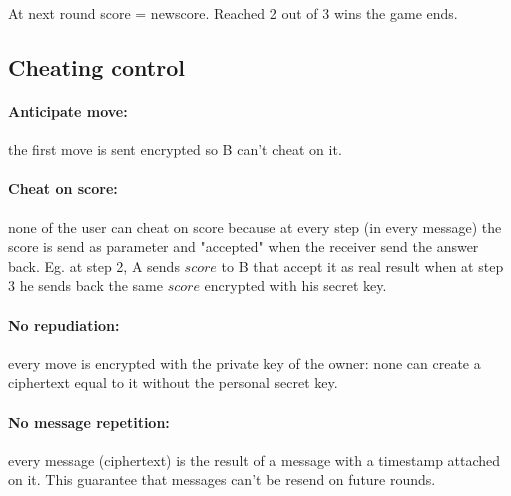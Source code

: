 \documentclass[11pt,a4paper]{article}
\begin{document}
At next round score = newscore. Reached 2 out of 3 wins the game ends.

\subsection{Cheating control}
\paragraph{\textbf{Anticipate move:}} the first move is sent encrypted so B can't cheat on it.
\paragraph{\textbf{Cheat on score:}} none of the user can cheat on score because at every step (in every message) the score is send as parameter and "accepted" when the receiver send the answer back.
Eg. at step 2, A sends $score$ to B that accept it as real result when at step 3 he sends back the same $score$ encrypted with his secret key.
\paragraph{\textbf{No repudiation:}} every move is encrypted with the private key of the owner: none can create a ciphertext equal to it without the personal secret key.
\paragraph{\textbf{No message repetition:}} every message (ciphertext) is the result of a message with a timestamp attached on it. This guarantee that messages can't be resend on future rounds.
\end{document}
